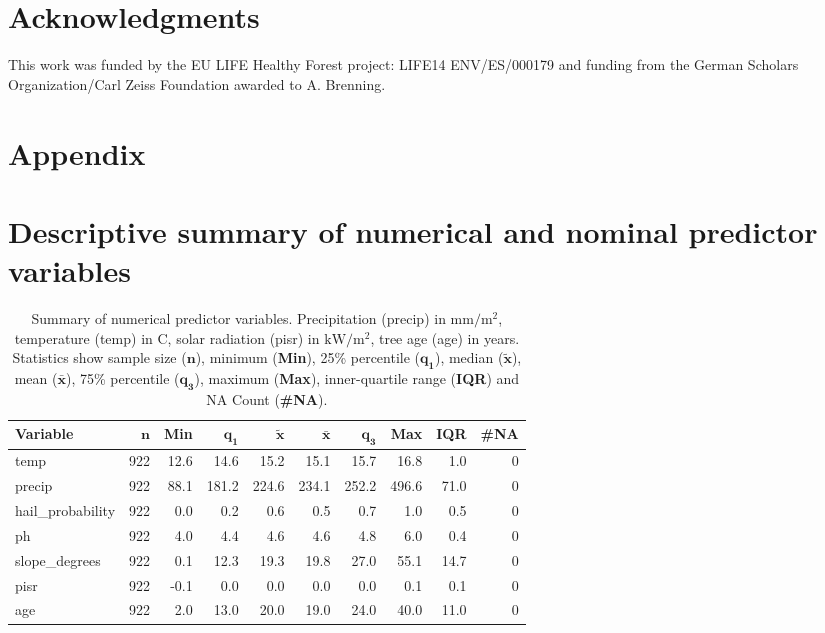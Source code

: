 \documentclass[review]{elsarticle}
\begin{document}
\section{Acknowledgments}
This work was funded by the EU LIFE Healthy Forest project: LIFE14 ENV/ES/000179 and funding from the German Scholars Organization/Carl Zeiss Foundation awarded to A. Brenning.

\section{Appendix}

\appendix
\gdef\thesection{\Alph{section}} %
\makeatletter
\renewcommand\@seccntformat[1]{Appendix \csname the#1\endcsname.\hspace{0.5em}}
\makeatother

\section{Descriptive summary of numerical and nominal predictor variables}

\begin{table}[H]
	\centering
	\begingroup\footnotesize
	\begin{tabular}{lrrrrrrrrr}
	 \textbf{Variable} & $\mathbf{n}$ & \textbf{Min} & $\mathbf{q_1}$ & $\mathbf{\widetilde{x}}$ & $\mathbf{\bar{x}}$ & $\mathbf{q_3}$ & \textbf{Max} & \textbf{IQR} & \textbf{\#NA} \\ 
		\hline
	temp & 922 & 12.6 &  14.6 &  15.2 &  15.1 &  15.7 &  16.8 &  1.0 & 0 \\ 
		precip & 922 & 88.1 & 181.2 & 224.6 & 234.1 & 252.2 & 496.6 & 71.0 & 0 \\ 
		hail\_probability & 922 &  0.0 &   0.2 &   0.6 &   0.5 &   0.7 &   1.0 &  0.5 & 0 \\ 
		ph & 922 &  4.0 &   4.4 &   4.6 &   4.6 &   4.8 &   6.0 &  0.4 & 0 \\ 
		slope\_degrees & 922 &  0.1 &  12.3 &  19.3 &  19.8 &  27.0 &  55.1 & 14.7 & 0 \\ 
		pisr & 922 & -0.1 &   0.0 &   0.0 &   0.0 &   0.0 &   0.1 &  0.1 & 0 \\ 
		age & 922 &  2.0 &  13.0 &  20.0 &  19.0 &  24.0 &  40.0 & 11.0 & 0 \\ 
		\end{tabular}
	\endgroup
	\caption{Summary of numerical predictor variables. Precipitation (precip) in $\mathrm{mm/m^{2}}$, temperature (temp) in \degree C, solar radiation (pisr) in $\mathrm{kW/m^{2}}$, tree age (age) in years. Statistics show sample size ($\mathbf{n}$), minimum (\textbf{Min}), 25\% percentile ($\mathbf{q_1}$), median ($\mathbf{\widetilde{x}}$), mean ($\mathbf{\bar{x}}$), 75\% percentile ($\mathbf{q_3}$), maximum (\textbf{Max}), inner-quartile range (\textbf{IQR}) and NA Count (\textbf{\#NA}).}
	\label{}
	\end{table}
\end{document}
